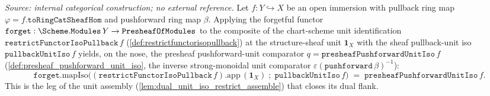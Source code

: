 \begin{lemma}

  \label{lem:forget_unit_restrict_eq_pushforward_unit}
  \textit{Source: internal categorical construction; no external reference.}
  Let \(f : Y \hookrightarrow X\) be an open immersion with pullback ring map
  \(\varphi = f.\mathtt{toRingCatSheafHom}\) and pushforward ring map \(\beta\). Applying the
  forgetful functor \(\mathtt{forget} : \Scheme.\mathtt{Modules}\,Y \to \mathtt{PresheafOfModules}\)
  to the composite of the chart-scheme unit identification
  \(\mathtt{restrictFunctorIsoPullback}\,f\) (\cref{def:restrictfunctorisopullback}) at the
  structure-sheaf unit \(\mathbf 1_X\) with the sheaf pullback-unit iso \(\mathtt{pullbackUnitIso}\,f\)
  yields, on the nose, the presheaf pushforward-unit comparator
  \(q = \mathtt{presheafPushforwardUnitIso}\,f\) (\cref{def:presheaf_pushforward_unit_iso}, the inverse
  strong-monoidal unit comparator \(\varepsilon(\mathtt{pushforward}\,\beta)^{-1}\)):
  \[
    \mathtt{forget}.\mathrm{mapIso}\bigl(
      (\mathtt{restrictFunctorIsoPullback}\,f).\mathrm{app}\,(\mathbf 1_X)
        \;\mathbin{;}\; \mathtt{pullbackUnitIso}\,f\bigr)
      \;=\; \mathtt{presheafPushforwardUnitIso}\,f .
  \]
  This is the leg of the unit assembly (\cref{lem:dual_unit_iso_restrict_assemble}) that closes its
  dual flank.
\end{lemma}
